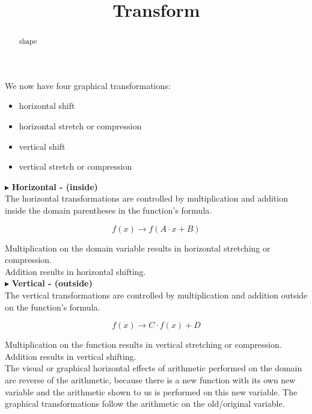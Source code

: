 \documentclass{ximera}
\title{Transform}
\begin{document}
\begin{abstract}
shape
\end{abstract}
\maketitle



We now have four graphical transformations:


\begin{itemize}
\item horizontal shift
\item horizontal stretch or compression
\item vertical shift
\item vertical stretch or compression
\end{itemize}






$\blacktriangleright$  \textbf{\textcolor{purple!85!blue}{Horizontal - (inside)}}  \\


The horizontal transformations are controlled by multiplication and addition inside the domain parentheses in the function's formula.

\[      f(x) \longrightarrow   f(A \cdot x + B)  \]

Multiplication on the domain variable results in horizontal stretching or compression. \\
Addition results in horizontal shifting. \\





$\blacktriangleright$   \textbf{\textcolor{purple!85!blue}{Vertical - (outside)}}  \\



The vertical transformations are controlled by multiplication and addition outside on the function's formula.

\[      f(x) \longrightarrow   C \cdot f(x) + D \]

Multiplication on the function results in vertical stretching or compression. \\
Addition results in vertical shifting. \\





The visual or graphical horizontal effects of arithmetic performed on the domain are reverse of the arithmetic, because  there is a new function with its own new variable and the arithmetic shown to us is performed on this new variable.  The graphical transformations follow the arithmetic on the old/original variable.
\end{document}
